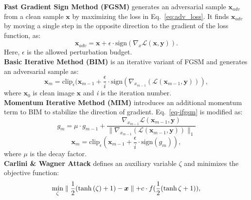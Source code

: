 \documentclass[10pt,twocolumn,letterpaper]{article}
\newcommand{\bx}{{\bm x}}
\begin{document}
\noindent \textbf{Fast Gradient Sign Method (FGSM)} \cite{43405} generates an adversarial sample $\bm{x}_{adv}$ from a clean sample $\bm{x}$ by maximizing the loss in Eq.~\ref{eq:adv_loss}. It finds $\bm{x}_{adv}$ by moving a single step in the opposite direction to the gradient of the loss function, as:
\vspace{-0.7em}
\begin{equation}
    \label{eq:fgsm}
    \bm{x}_{adv} = \bm{x} + \epsilon \cdot \text{sign}(\nabla_x \mathcal{L}(\bx,\bm{y})).
\end{equation}
Here, $\epsilon$ is the allowed perturbation budget. \medskip \\ 
\textbf{Basic Iterative Method (BIM)} \cite{kurakin2016adversarial} is an iterative variant of FGSM and generates an adversarial sample as:
\vspace{-0.75em}
\begin{equation}
\label{eq-ifgsm}
 \bm{x}_{m} = \text{clip}_{\epsilon} (\bm{x}_{m-1} + \frac{\epsilon}{i} \cdot \text{sign}(\nabla_{x_{m-1}} (\mathcal{L}(\bm{x}_{m-1},\bm{y}))),
\end{equation}
where $\bm{x}_0$ is clean image $\bm{x}$ and \textit{i} is the iteration number. \medskip \\ 
\textbf{Momentum Iterative Method (MIM)} \cite{dong2018boosting} introduces an additional momentum term to BIM to stabilize the direction of gradient. Eq.\ \ref{eq-ifgsm} is modified as:
\vspace{-0.75em}
\begin{equation}
\label{eq:mifgsm}
 g_{m} = \mu \cdot g_{m-1} + \frac{\nabla_{x_{m-1}} \mathcal{L}(\bm{x}_{m-1},\bm{y})}{\parallel \nabla_{x_{m-1}} (\mathcal{L}(\bm{x}_{m-1},\bm{y})) \parallel_1}
\end{equation}
\vspace{-0.75em}
\begin{equation}
 \bm{x}_{m} = \text{clip}_{\epsilon} (\bm{x}_{m-1} + \frac{\epsilon}{i} \cdot \text{sign}(g_{m})),
\end{equation}
where $\mu$ is the decay factor. \medskip \\
\textbf{Carlini \& Wagner Attack} \cite{carlini2017towards} defines an auxiliary variable $\zeta$ and minimizes the objective function:
\vspace{-0.75em}
\begin{equation}
\underset{\zeta}{\text{min}} \parallel \frac{1}{2}(\tanh{(\zeta)}+1) - \bm{x} \parallel + c \cdot f(\frac{1}{2}(\tanh{\zeta}+1)),
\vspace{-0.5em}
\end{equation}
\end{document}
